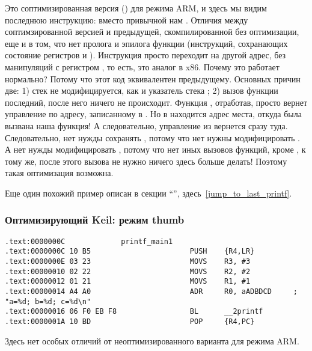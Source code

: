 Это соптимизированная версия (\Othree) для режима ARM, и здесь мы видим последнюю инструкцию:  вместо привычной
нам . 
Отличия между соптимзированной версией и предыдущей, скомпилированной без оптимизации, еще и в том, 
что нет пролога и эпилога функции (инструкций, сохранающих состояние регистров  и \LR).
Инструкция  просто переходит на другой адрес, без манипуляций с регистром \LR, то есть,
это аналог \JMP в x86.
Почему это работает нормально? Потому что этот код эквивалентен предыдущему.
Основных причин две: 1) стек не модифицируется, как и указатель стека \SP; 2) вызов функции \printf последний, 
после него ничего не происходит.
Функция \printf, отработав, просто вернет управление по адресу, записанному в \LR. Но в \LR находится адрес места,
откуда была вызвана наша функция! А следовательно, управление из \printf вернется сразу туда.
Следовательно, нет нужды сохранять \LR, потому что нет нужны модифицировать \LR. 
А нет нужды модифицировать \LR,
потому что нет иных вызовов функций, кроме \printf, к тому же, после этого вызова не нужно ничего здесь 
больше делать! Поэтому такая оптимизация возможна.

Еще один похожий пример описан в секции ``\SwitchCaseDefaultSectionName'', здесь~\ref{jump_to_last_printf}.

\subsubsection{Оптимизирующий Keil: режим thumb}

\begin{lstlisting}
.text:0000000C             printf_main1
.text:0000000C 10 B5                       PUSH    {R4,LR}
.text:0000000E 03 23                       MOVS    R3, #3
.text:00000010 02 22                       MOVS    R2, #2
.text:00000012 01 21                       MOVS    R1, #1
.text:00000014 A4 A0                       ADR     R0, aADBDCD     ; "a=%d; b=%d; c=%d\n"
.text:00000016 06 F0 EB F8                 BL      __2printf
.text:0000001A 10 BD                       POP     {R4,PC}
\end{lstlisting}

Здесь нет особых отличий от неоптимизированного варианта для режима ARM.


